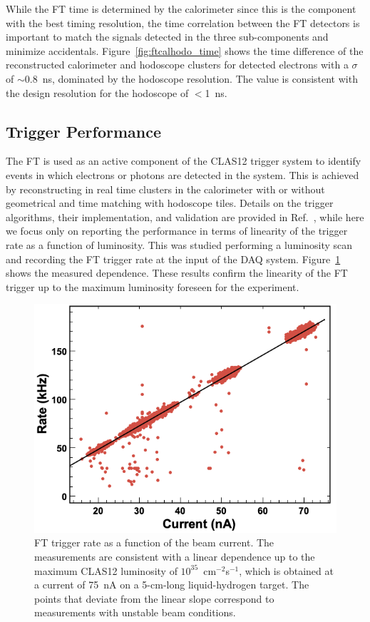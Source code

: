 While the FT time is determined by the calorimeter since this is the component with the best timing resolution,
the time correlation between the FT detectors is important to match the signals detected in the three
sub-components and minimize accidentals. Figure~\ref{fig:ftcalhodo_time} shows the time difference of the
reconstructed calorimeter and hodoscope clusters for detected electrons with a $\sigma$ of $\sim$0.8~ns,
dominated by the hodoscope resolution. The value is consistent with the design resolution for the hodoscope of
$<$1~ns.

\subsection{Trigger Performance}

The FT is used as an active component of the CLAS12 trigger system to identify events in which electrons or
photons are detected in the system. This is achieved by reconstructing in real time clusters in the calorimeter with
or without geometrical and time matching with hodoscope tiles. Details on the trigger algorithms, their implementation,
and validation are provided in Ref.~\cite{trigger}, while here we focus only on reporting the performance in terms of
linearity of the trigger rate as a function of luminosity. This was studied performing a luminosity scan and recording
the FT trigger rate at the input of the DAQ system. Figure~\ref{fig:trigger_rate} shows the measured dependence.
These results confirm the linearity of the FT trigger up to the maximum luminosity foreseen for the experiment.

\begin{figure}[h]
\includegraphics[height=0.68\columnwidth]{fig/ft_trigger.png}
\caption{FT trigger rate as a function of the beam current. The measurements are consistent with a linear dependence
  up to the maximum CLAS12 luminosity of $10^{35}$~cm$^{-2}$s$^{-1}$, which is obtained at a current of 75~nA on a
  5-cm-long liquid-hydrogen target. The points that deviate from the linear slope correspond to measurements with
  unstable beam conditions.}
\label{fig:trigger_rate}
\end{figure}

